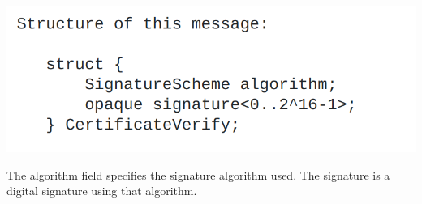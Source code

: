 \documentclass{article}
\begin{document}
\begin{center}
       \includegraphics[width=0.6\columnwidth]{media/CertVerify.png}
\end{center}

The algorithm field specifies the signature algorithm used.  The signature is a
   digital signature using that algorithm.
\end{document}
